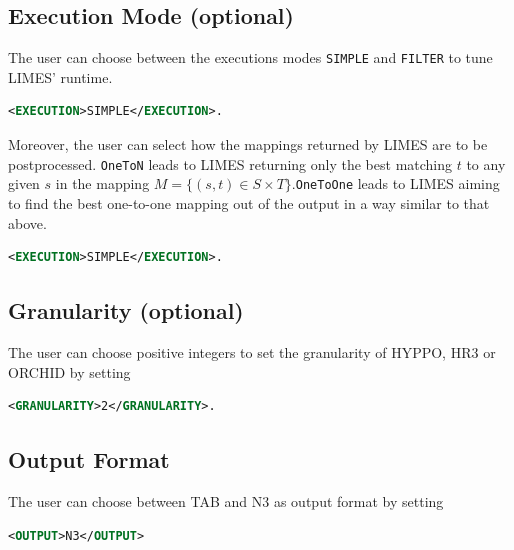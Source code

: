 \documentclass[a4paper, 11pt]{article}
\begin{document}
\subsection{Execution Mode (optional)}
The user can choose between the executions modes \texttt{SIMPLE} and \texttt{FILTER} to tune LIMES' runtime. 
\begin{ttfamily}
\begin{lstlisting}[language=XML,basicstyle=\scriptsize,numberstyle=\tiny]
<EXECUTION>SIMPLE</EXECUTION>.
\end{lstlisting}
\end{ttfamily}
Moreover, the user can select how the mappings returned by LIMES are to be postprocessed. \texttt{OneToN} leads to LIMES returning only the best matching $t$ to any given $s$ in the mapping $M = \{(s, t) \in S \times T \}$.\texttt{OneToOne} leads to LIMES aiming to find the best one-to-one mapping out of the output in a way similar to that above.

\begin{ttfamily}
\begin{lstlisting}[language=XML,basicstyle=\scriptsize,numberstyle=\tiny]
<EXECUTION>SIMPLE</EXECUTION>.
\end{lstlisting}
\end{ttfamily}
\subsection{Granularity (optional)}

The user can choose positive integers to set the granularity of HYPPO, HR3 or ORCHID by setting

\begin{ttfamily}
\begin{lstlisting}[language=XML,basicstyle=\scriptsize,numberstyle=\tiny]
<GRANULARITY>2</GRANULARITY>.
\end{lstlisting}
\end{ttfamily}

\subsection{Output Format}
The user can choose between TAB and N3 as output format by setting

\begin{ttfamily}
\begin{lstlisting}[language=XML,basicstyle=\scriptsize,numberstyle=\tiny]
<OUTPUT>N3</OUTPUT>
\end{lstlisting}
\end{ttfamily}
\end{document}
